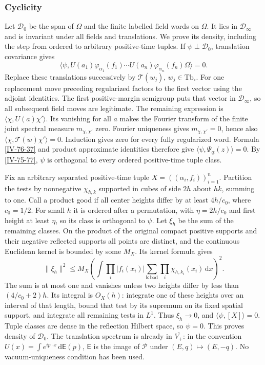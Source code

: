 \documentclass[11pt,letterpaper,reqno]{amsart}
\theoremstyle{definition}
\theoremstyle{remark}
\begin{document}
\subsubsection{Cyclicity}\label{qcd:reconstruction-cyclicity}

Let $\mathcal D_0$ be the span of $\Omega$ and the finite
labelled field words on $\Omega$. It lies in
$\mathcal D_\infty$ and is invariant under all fields and
translations. We prove its density, including the step from
ordered to arbitrary positive-time tuples.
If $\psi\perp\mathcal D_0$, translation covariance gives
\[
 \langle\psi,U(a_1)\varphi_{\alpha_1}(f_1)\cdots
                    U(a_n)\varphi_{\alpha_n}(f_n)\Omega\rangle=0.
\]
Replace these translations successively by
$\mathcal T(w_j)$, $w_j\in\mathrm{Tb}_\circ$.
For one replacement move preceding regularized factors to the
first vector using the adjoint identities. The first
positive-margin semigroup puts that vector in
$\mathcal D_\infty$, so all subsequent field moves are
legitimate. The remaining expression is
$\langle\chi,U(a)\chi'\rangle$. Its vanishing for all $a$
makes the Fourier transform of the finite joint spectral
measure $m_{\chi,\chi'}$ zero. Fourier uniqueness gives
$m_{\chi,\chi'}=0$, hence also
$\langle\chi,\mathcal T(w)\chi'\rangle=0$.
Induction gives zero for every fully regularized word.
Formula \eqref{IV-76-37} and product approximate identities
therefore give $\langle\psi,\Psi_{\underline\alpha}(z)\rangle=0$.
By \eqref{IV-75-77}, $\psi$ is orthogonal to every ordered
positive-time tuple class.

Fix an arbitrary separated positive-time tuple
$X=((\alpha_i,f_i))_{i=1}^n$. Partition the tests by
nonnegative $\chi_{h,k}$ supported in cubes of side $2h$
about $hk$, summing to one. Call a product good if all center
heights differ by at least $4h/c_0$, where $c_0=1/2$.
For small $h$ it is ordered after a permutation, with
$\eta=2h/c_0$ and first height at least $\eta$, so its class
is orthogonal to $\psi$. Let $\xi_h$ be the sum of the
remaining classes. On the product of the original compact
positive supports and their negative reflected supports all
points are distinct, and the continuous Euclidean kernel is
bounded by some $M_X$. Its kernel formula gives
\begin{equation}\label{IV-76-43}
 \|\xi_h\|^2\le M_X
 \left(\int\prod_i|f_i(x_i)|
       \sum_{\mathbf k\,\mathrm{bad}}\prod_i\chi_{h,k_i}(x_i)
                                              \,\mathrm{d}x\right)^2.
\end{equation}
The sum is at most one and vanishes unless two heights differ
by less than $(4/c_0+2)h$. Its integral is $O_X(h)$:
integrate one of these heights over an interval of that
length, bound that test by its supremum on its fixed spatial
support, and integrate all remaining tests in $L^1$.
Thus $\xi_h\to0$, and $\langle\psi,[X]\rangle=0$.
Tuple classes are dense in the reflection Hilbert space,
so $\psi=0$. This proves density of $\mathcal D_0$.
The translation spectrum is already in $\overline{V_+}$:
in the convention $U(x)=\int e^{ip\cdot x}\,\mathrm{d}\mathsf E(p)$,
$\mathsf E$ is the image of $\mathcal P$ under $(E,q)\mapsto(E,-q)$.
No vacuum-uniqueness condition has been used.
\end{document}

